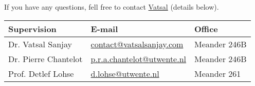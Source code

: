 \documentclass[a4paper,10pt]{article}
\begin{document}
If you have any questions, fell free to contact \href{mailto:contact@vatsalsanjay.com}{Vatsal} (details below).
\begin{center}
\begin{tabular}{|l|l|l|}
\hline \textbf{Supervision} & \textbf{E-mail} & \textbf{Office} \\
\hline Dr. Vatsal Sanjay & \href{mailto:v.sanjay@utwente.nl}{contact@vatsalsanjay.com} & Meander 246B \\
\hline Dr. Pierre Chantelot   & \href{mailto:p.r.a.chantelot@utwente.nl}{p.r.a.chantelot@utwente.nl}& Meander 246B \\
\hline Prof. Detlef Lohse & \href{mailto:d.lohse@utwente.nl}{d.lohse@utwente.nl} & Meander 261  \\
\hline
\end{tabular}
\end{center}

\printbibliography
\end{document}
